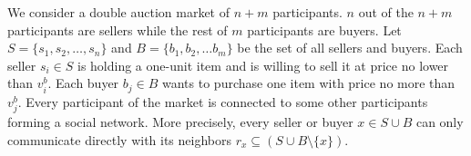 We consider a double auction market of $n+m$ participants.
$n$ out of the $n+m$ participants are sellers while the rest of $m$ participants are buyers.
Let $S=\{s_1,s_2,\ldots, s_n\}$ and $B=\{b_1,b_2,\ldots b_m\}$ be the set of all sellers and buyers.
Each seller $s_i\in S$ is holding a one-unit item and is willing to sell it at price no lower than $v^b_i$.
Each buyer $b_j\in B$ wants to purchase one item with price no more than $v^b_j$.
Every participant of the market is connected to some other participants forming a social network.
More precisely, every seller or buyer $x\in S\cup B$ can only communicate directly with its neighbors $r_x\subseteq (S\cup B\setminus \{x\})$.


